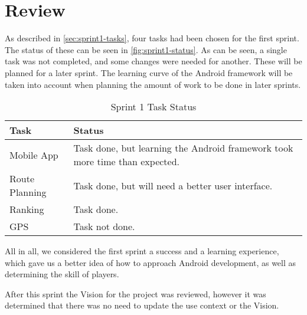 \section{Review}
\label{sec:sprint1-review}

As described in \autoref{sec:sprint1-tasks}, four tasks had been chosen for the first sprint. The status of these can be seen in \autoref{fig:sprint1-status}. As can be seen, a single task was not completed, and some changes were needed for another. These will be planned for a later sprint. The learning curve of the Android framework will be taken into account when planning the amount of work to be done in later sprints.

\begin{table}[ht!]
	\centering
	\begin{tabular}{|l|p{8cm}|}
		\hline
		\textbf{Task} & \textbf{Status} \\
		\hline
		Mobile App & Task done, but learning the Android framework took more time than expected. \\
		\hline
		Route Planning & Task done, but will need a better user interface. \\
		\hline
		Ranking & Task done. \\
		\hline
		\ac{GPS} & Task not done. \\
	\hline
	\end{tabular}
	\caption{Sprint 1 Task Status}
	\label{fig:sprint1-status}
\end{table}

All in all, we considered the first sprint a success and a learning experience, which gave us a better idea of how to approach Android development, as well as determining the skill of players.

After this sprint the Vision for the project was reviewed, however it was determined that there was no need to update the use context or the Vision.
